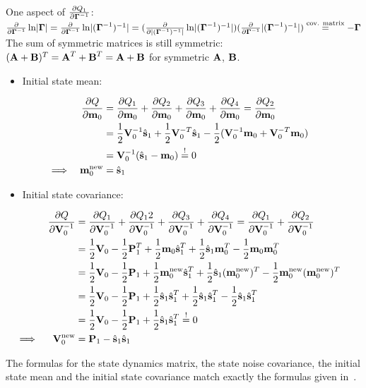 		\doublefootnotetext
			{One aspect of \( \pdv{Q_1}{\mat{\Gamma}^{-1}} \): \( \pdv{\mat{\Gamma}^{-1}} \ln \Det{\mat{\Gamma}} = \pdv{\mat{\Gamma}^{-1}} \ln \Det{\paren{\mat{\Gamma}^{-1}}^{-1}} = \paren{ \pdv{\Det{\paren{\mat{\Gamma}^{-1}}^{-1}}} \ln \Det{\paren{\mat{\Gamma}^{-1}}^{-1}} } \paren{ \pdv{\mat{\Gamma}^{-1}} \Det{\paren{\mat{\Gamma}^{-1}}^{-1}} } \overset{\text{cov. matrix}}{=} -\mat{\Gamma} \)}
			{The sum of symmetric matrices is still symmetric: \( (\mat{A} + \mat{B})^T = \mat{A}^T + \mat{B}^T = \mat{A} + \mat{B} \) for symmetric \( \mat{A} \), \( \mat{B} \).}
		
		\begin{itemize}
			\item Initial state mean:
		\end{itemize}
		\begin{align*}
			&& \pdv{Q}{\vec{m}_0}
				&= \pdv{Q_1}{\vec{m}_0} + \pdv{Q_2}{\vec{m}_0} + \pdv{Q_3}{\vec{m}_0} + \pdv{Q_4}{\vec{m}_0} = \pdv{Q_2}{\vec{m}_0} & \\
			&&	&= \frac{1}{2} \mat{V}_0^{-1} \hat{\vec{s}}_1 + \frac{1}{2} \mat{V}_0^{-T} \hat{\vec{s}}_1 - \frac{1}{2} \paren{\mat{V}_0^{-1} \vec{m}_0 + \mat{V}_0^{-T} \vec{m}_0} & \\
			&&	&= \mat{V}_0^{-1} \paren{\hat{\vec{s}}_1 - \vec{m}_0} \overset{!}{=} 0 & \\
			\implies && \vec{m}_0^\new &= \hat{\vec{s}}_1 &
		\end{align*}
		
		\begin{itemize}
			\item Initial state covariance:
		\end{itemize}
		\begin{align*}
			&& \pdv{Q}{\mat{V}_0^{-1}}
				&= \pdv{Q_1}{\mat{V}_0^{-1}} + \pdv{Q_12}{\mat{V}_0^{-1}} + \pdv{Q_3}{\mat{V}_0^{-1}} + \pdv{Q_4}{\mat{V}_0^{-1}} = \pdv{Q_1}{\mat{V}_0^{-1}} + \pdv{Q_2}{\mat{V}_0^{-1}} & \\
			&&	&= \frac{1}{2} \mat{V}_0 - \frac{1}{2} \mat{P}_1^T + \frac{1}{2} \vec{m}_0 \hat{\vec{s}}_1^T + \frac{1}{2} \hat{\vec{s}}_1 \vec{m}_0^T - \frac{1}{2} \vec{m}_0 \vec{m}_0^T & \\
			&&	&= \frac{1}{2} \mat{V}_0 - \frac{1}{2} \mat{P}_1 + \frac{1}{2} \vec{m}_0^\new \hat{\vec{s}}_1^T + \frac{1}{2} \hat{\vec{s}}_1 \paren{\vec{m}_0^\new}^T - \frac{1}{2} \vec{m}_0^\new \paren{\vec{m}_0^\new}^T & \\
			&&	&= \frac{1}{2} \mat{V}_0 - \frac{1}{2} \mat{P}_1 + \frac{1}{2} \hat{\vec{s}}_1 \hat{\vec{s}}_1^T + \frac{1}{2} \hat{\vec{s}}_1 \hat{\vec{s}}_1^T - \frac{1}{2} \hat{\vec{s}}_1 \hat{\vec{s}}_1^T & \\
			&&	&= \frac{1}{2} \mat{V}_0 - \frac{1}{2} \mat{P}_1 + \frac{1}{2} \hat{\vec{s}}_1 \hat{\vec{s}}_1^T \overset{!}{=} 0 & \\
			\implies && \mat{V}_0^\new &= \mat{P}_1 - \hat{\vec{s}}_1 \hat{\vec{s}}_1 &
		\end{align*}
		
		The formulas for the state dynamics matrix, the state noise covariance, the initial state mean and the initial state covariance match exactly the formulas given in~\cite{ghahramaniParameterEstimationLinear1996}.
